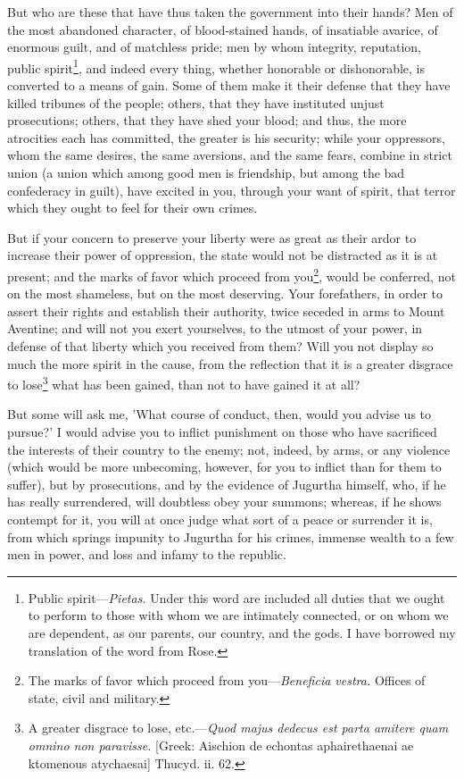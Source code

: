 But who are these that have thus taken the government into their
hands? Men of the most abandoned character, of blood-stained hands, of
insatiable avarice, of enormous guilt, and of matchless pride; men by
whom integrity, reputation, public spirit\footnote{Public spirit—\emph{Pietas.} Under this word are included all
duties that we ought to perform to those with whom we are intimately
connected, or on whom we are dependent, as our parents, our country,
and the gods. I have borrowed my translation of the word from Rose.}, and indeed every
thing, whether honorable or dishonorable, is converted to a means of
gain. Some of them make it their defense that they have killed
tribunes of the people; others, that they have instituted unjust
prosecutions; others, that they have shed your blood; and thus, the
more atrocities each has committed, the greater is his security; while
your oppressors, whom the same desires, the same aversions, and the
same fears, combine in strict union (a union which among good men is
friendship, but among the bad confederacy in guilt), have excited in
you, through your want of spirit, that terror which they ought to feel
for their own crimes.

But if your concern to preserve your liberty were as great as their
ardor to increase their power of oppression, the state would not be
distracted as it is at present; and the marks of favor which proceed
from you\footnote{The marks of favor which proceed from you—\emph{Beneficia vestra.}
Offices of state, civil and military.}, would be conferred, not on the most shameless, but on
the most deserving. Your forefathers, in order to assert their rights
and establish their authority, twice seceded in arms to Mount
Aventine; and will not you exert yourselves, to the utmost of your
power, in defense of that liberty which you received from them? Will
you not display so much the more spirit in the cause, from the
reflection that it is a greater disgrace to lose\footnote{A greater disgrace to lose, etc.—\emph{Quod majus dedecus est
parta amitere quam omnino non paravisse.} [Greek: Aischion de echontas
aphairethaenai ae ktomenous atychaesai] Thucyd. ii. 62.} what has been
gained, than not to have gained it at all?

But some will ask me, 'What course of conduct, then, would you advise
us to pursue?' I would advise you to inflict punishment on those who
have sacrificed the interests of their country to the enemy; not,
indeed, by arms, or any violence (which would be more unbecoming,
however, for you to inflict than for them to suffer), but by
prosecutions, and by the evidence of Jugurtha himself, who, if he has
really surrendered, will doubtless obey your summons; whereas, if he
shows contempt for it, you will at once judge what sort of a peace or
surrender it is, from which springs impunity to Jugurtha for his
crimes, immense wealth to a few men in power, and loss and infamy to
the republic.

